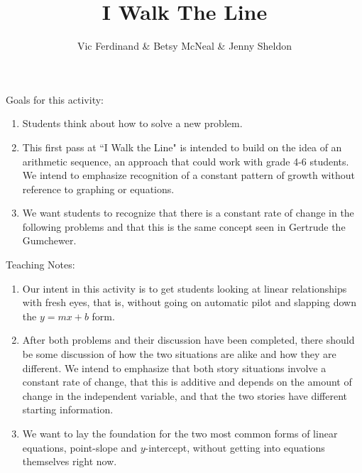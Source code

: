 \documentclass{ximera}
\title{I Walk The Line}
\author{Vic Ferdinand \& Betsy McNeal \& Jenny Sheldon}
\begin{document}
\begin{abstract}
\end{abstract}
\maketitle

\begin{instructorIntro}
Goals for this activity:
\begin{enumerate}
\item Students think about how to solve a new problem.
\item  This first pass at ``I Walk the Line" is intended to build on the idea of an arithmetic sequence, an approach that could work with grade 4-6 students.  We intend to emphasize  recognition of a constant pattern of growth without reference to graphing or equations.
\item We want students to recognize that there is a constant rate of change in the following problems and that this is the same concept seen in Gertrude the Gumchewer.
\end{enumerate}

Teaching Notes:
\begin{enumerate}
\item Our intent in this activity is to get students looking at linear relationships with fresh eyes, that is, without going on automatic pilot and slapping down the $y = mx + b$ form.
\item  After both problems and their discussion have been completed, there should be some discussion of how the two situations are alike and how they are different.  We intend to emphasize that both story situations involve a constant rate of change, that this is additive and depends on the amount of change in the independent variable, and that the two stories have different starting information.  
\item  We want to lay the foundation for the two most common forms of linear equations, point-slope and $y$-intercept, without getting into equations themselves right now.  
\end{enumerate}
\end{instructorIntro}
\end{document}
